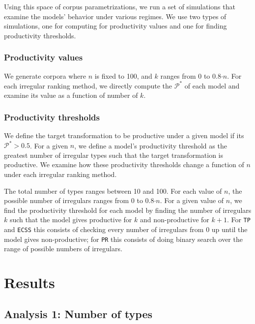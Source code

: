\documentclass[
   11pt,
       ]{book}
\begin{document}
Using this space of corpus parametrizations, we run a set of simulations that
examine the models' behavior under various regimes. We use two types of
simulations, one for computing for productivity values and one for finding
productivity thresholds.

\hypertarget{productivity-values}{%
\subsubsection{Productivity values}\label{productivity-values}}

We generate corpora where \(n\) is fixed to 100, and \(k\) ranges from 0 to
0.8\(\cdot n\). For each irregular ranking method, we directly compute
the \(\mathcal{P}^*\) of each model and examine its value as a function of number
of \(k\).

\hypertarget{productivity-thresholds}{%
\subsubsection{Productivity thresholds}\label{productivity-thresholds}}

We define the target transformation to be productive under a given model if its
\(\mathcal{P}^*>0.5\). For a given \(n\), we define a model's productivity threshold
as the greatest number of irregular types such that the target transformation is
productive. We examine how these productivity thresholds change a function of
\(n\) under each irregular ranking method.

The total number of types ranges between 10 and
100. For each value of \(n\), the possible number of irregulars
ranges from 0 to 0.8\(\cdot n\). For a given value of \(n\), we find the
productivity threshold for each model by finding the number of irregulars \(k\)
such that the model gives productive for \(k\) and non-productive for \(k+1\). For
\texttt{TP} and \texttt{ECSS} this consists of checking every number of irregulars from 0 up
until the model gives non-productive; for \texttt{PR} this consists of doing binary
search over the range of possible numbers of irregulars.

\hypertarget{results-1}{%
\section{Results}\label{results-1}}

\hypertarget{analysis-1-number-of-types}{%
\subsection{Analysis 1: Number of types}\label{analysis-1-number-of-types}}
\end{document}
